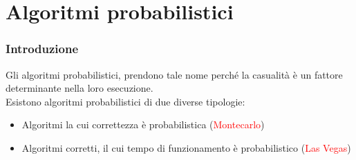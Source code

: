 \documentclass[../cheatSheetAlgoritmi.tex]{subfiles}
\begin{document}
\chapter{Algoritmi probabilistici}
\subsection{Introduzione}
Gli algoritmi probabilistici, prendono tale nome perché la casualità è un fattore determinante nella loro esecuzione. \\
Esistono algoritmi probabilistici di due diverse tipologie:
\begin{itemize}
	\item Algoritmi la cui correttezza è probabilistica (\textcolor{red}{Montecarlo})
	\item Algoritmi corretti, il cui tempo di funzionamento è probabilistico (\textcolor{red}{Las Vegas})
\end{itemize}
\end{document}
